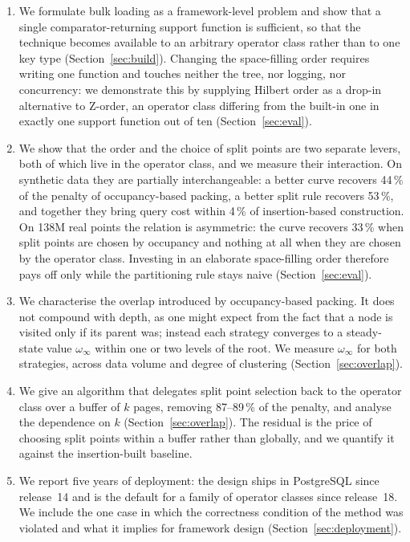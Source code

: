 \begin{enumerate}
\item We formulate bulk loading as a framework-level problem and show that a
      single comparator-returning support function is sufficient, so that the
      technique becomes available to an arbitrary operator class rather than to
      one key type (Section~\ref{sec:build}). Changing the space-filling order
      requires writing one function and touches neither the tree, nor logging,
      nor concurrency: we demonstrate this by supplying Hilbert order as a
      drop-in alternative to Z-order, an operator class differing from the
      built-in one in exactly one support function out of ten
      (Section~\ref{sec:eval}).
\item We show that the order and the choice of split points are two separate
      levers, both of which live in the operator class, and we measure their
      interaction. On synthetic data they are partially interchangeable: a
      better curve recovers 44\,\% of the penalty of occupancy-based packing, a
      better split rule recovers 53\,\%, and together they bring query cost
      within 4\,\% of insertion-based construction. On 138M real points the
      relation is asymmetric: the curve recovers 33\,\% when split points are
      chosen by occupancy and nothing at all when they are chosen by the
      operator class. Investing in an elaborate space-filling order therefore
      pays off only while the partitioning rule stays naive
      (Section~\ref{sec:eval}).
\item We characterise the overlap introduced by occupancy-based packing. It does
      not compound with depth, as one might expect from the fact that a node is
      visited only if its parent was; instead each strategy converges to a
      steady-state value $\omega_\infty$ within one or two levels of the root.
      We measure $\omega_\infty$ for both strategies, across data volume and
      degree of clustering (Section~\ref{sec:overlap}).
\item We give an algorithm that delegates split point selection back to the
      operator class over a buffer of $k$ pages, removing 87--89\,\% of the
      penalty, and analyse the dependence on $k$ (Section~\ref{sec:overlap}).
      The residual is the price of choosing split points within a buffer rather
      than globally, and we quantify it against the insertion-built baseline.
\item We report five years of deployment: the design ships in PostgreSQL since
      release~14 and is the default for a family of operator classes since
      release~18. We include the one case in which the correctness condition of
      the method was violated and what it implies for framework design
      (Section~\ref{sec:deployment}).
\end{enumerate}


